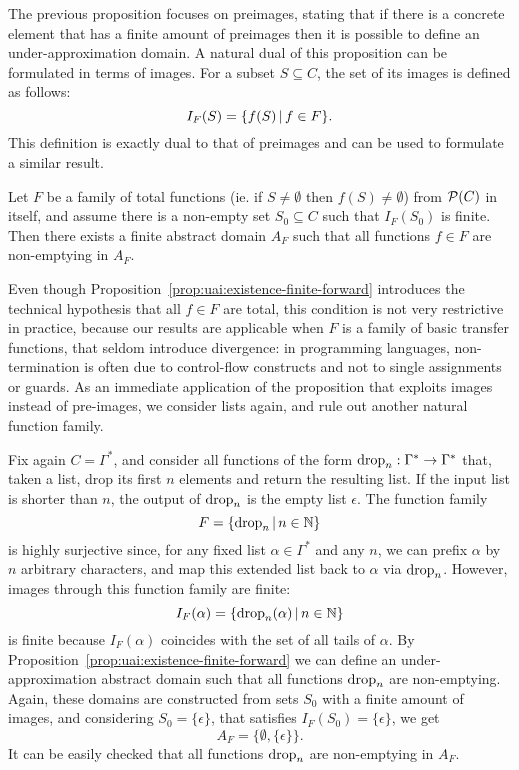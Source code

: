 The previous proposition focuses on preimages, stating that if there is a concrete element that has a finite amount of preimages then it is possible to define an under-approximation domain. A natural dual of this proposition can be formulated in terms of images.
For a subset $S \subseteq C$, the set of its images is defined as follows:
\[
I_F(S) = \{ f(S) \,\vert\, f \in F \} .
\]
This definition is exactly dual to that of preimages and can be used to formulate a similar result.
\begin{prop}\label{prop:uai:existence-finite-forward}
	Let $F$ be a family of total functions (ie. if $S \neq \emptyset$ then $f(S) \neq \emptyset$) from $\mathcal{P}(C)$ in itself, and assume there is a non-empty set $S_0 \subseteq C$ such that $I_F(S_0)$ is finite. Then there exists a finite abstract domain $A_F$ such that all functions $f \in F$ are non-emptying in $A_F$.
\end{prop}
Even though Proposition~\ref{prop:uai:existence-finite-forward} introduces the technical hypothesis that all $f \in F$ are total, this condition is not very restrictive in practice, because our results are applicable when $F$ is a family of basic transfer functions, that seldom introduce divergence: in programming languages, non-termination is often due to control-flow constructs and not to single assignments or guards.
As an immediate application of the proposition that exploits images instead of pre-images, we consider lists again, and rule out another natural function family.
\begin{example}\label{ex:uai:construction-ne-domain-forward}
	Fix again $C = \Gamma^{*}$, and consider all functions of the form $\text{drop}_n : \Gamma^* \rightarrow \Gamma^*$ that, taken a list, drop its first $n$ elements and return the resulting list. If the input list is shorter than $n$, the output of $\text{drop}_n$ is the empty list $\epsilon$.
	The function family
	\[
	F = \{ \text{drop}_n \,\vert\, n \in \mathbb{N} \}
	\]
	is highly surjective since, for any fixed list $\alpha \in \Gamma^*$ and any $n$, we can prefix $\alpha$ by $n$ arbitrary characters, and map this extended list back to $\alpha$ via $\text{drop}_n$.
	However, images through this function family are finite:
	\[
	I_F(\alpha) = \{ \text{drop}_n(\alpha) \,\vert\, n \in \mathbb{N} \}
	\]
	is finite because $I_F(\alpha)$ coincides with the set of all tails of $\alpha$. By Proposition~\ref{prop:uai:existence-finite-forward} we can define an under-approximation abstract domain such that all functions $\text{drop}_n$ are non-emptying. Again, these domains are constructed from sets $S_0$ with a finite amount of images, and considering $S_0 = \{ \epsilon \}$, that satisfies $I_F(S_0) = \{ \epsilon \}$, we get
	\[
	A_F = \{ \emptyset, \{ \epsilon \} \} .
	\]
	It can be easily checked that all functions $\text{drop}_n$ are non-emptying in $A_F$.
\end{example}

